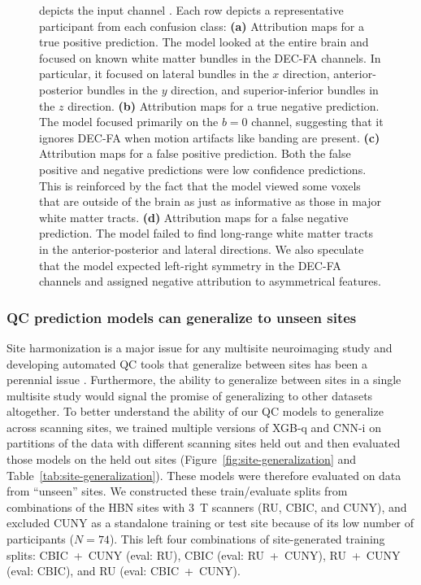\documentclass[fleqn,10pt,inline]{wlscirep}
\begin{document}
\begin{figure}[tbp]
{        depicts the input channel . Each row depicts a representative participant
        from each confusion class:
        \textbf{(a)} Attribution maps for a true positive prediction. The model
        looked at the entire brain and focused on known white matter bundles in
        the DEC-FA channels. In particular, it focused on lateral bundles in the
        $x$ direction, anterior-posterior bundles in the $y$ direction, and
        superior-inferior bundles in the $z$ direction.
        \textbf{(b)} Attribution maps for a true negative prediction. The model
        focused primarily on the $b=0$ channel, suggesting that it ignores
        DEC-FA when motion artifacts like banding are present.
        \textbf{(c)} Attribution maps for a false positive prediction. Both the
        false positive and negative predictions were low confidence predictions.
        This is reinforced by the fact that the model viewed some voxels that are outside of the brain as just as informative as those in major white
        matter tracts.
        \textbf{(d)} Attribution maps for a false negative prediction. The model
        failed to find long-range white matter tracts in the anterior-posterior
        and lateral directions. We also speculate that the model expected
        left-right symmetry in the DEC-FA channels and assigned negative
        attribution to asymmetrical features. }
    \label{fig:ig}
\end{figure}

\subsubsection*{QC prediction models can generalize to unseen sites}

Site harmonization is a major issue for any multisite neuroimaging study and developing automated QC tools that generalize between sites has been a perennial issue \cite{esteban2017mriqc}. Furthermore, the ability to generalize between sites in a single multisite study would signal the promise of generalizing to other datasets altogether. To better understand the ability of our QC models to generalize across scanning sites, we trained multiple versions of XGB-q and CNN-i on partitions of the data with different scanning sites held out and then evaluated those models on the held out sites (Figure~\ref{fig:site-generalization} and Table~\ref{tab:site-generalization}). These models were therefore evaluated on data from ``unseen'' sites. We constructed these train/evaluate splits from combinations of the HBN sites with \qty{3}{\tesla} scanners (RU, CBIC, and CUNY), and excluded CUNY as a standalone training or test site because of its low number of participants ($N=74$). This left four combinations of site-generated training splits: CBIC~+~CUNY (eval: RU), CBIC (eval: RU~+~CUNY), RU~+~CUNY (eval: CBIC), and RU (eval: CBIC~+~CUNY).
\end{document}
